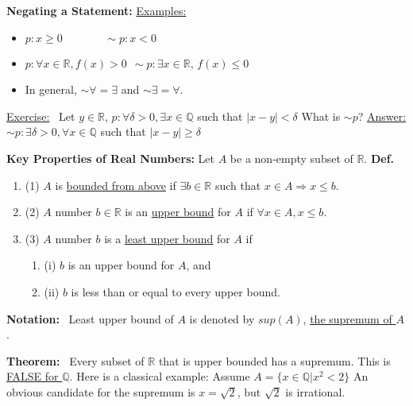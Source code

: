 \documentclass[letterpaper]{article}
\newcommand{\real}{\mathbb R}  %
\begin{document}
\textbf{Negating a Statement:}
\newline
\underline{Examples:}
    \begin{itemize}
        \item[] $p: x\geq 0\ \ \ \ \ \ \ \ \ \ \ \ \ \ \ \ \ \sim p: x< 0$
        \item[] $p: \forall x \in \real, f(x) > 0\ \ \sim p: \exists x \in \real$, $f(x) \leq 0$
        \item[] In general, $\sim \forall = \exists$ and $\sim \exists = \forall$.
    \end{itemize}
\underline{Exercise:}~ Let $y\in\real$,
    \newline
    $p: \forall\delta>0, \exists x \in \mathbb{Q}$ such that $|x-y| < \delta$
    \newline
    What is $\sim p$?
\newline
\underline{Answer:}
    \newline
    $\sim p: \exists\delta>0, \forall x \in \mathbb{Q}$ such that $|x-y| \geq \delta$

\textbf{Key Properties of Real Numbers:} Let $A$ be a non-empty subset of $\real$.
\newline\newline
\textbf{Def.}
    \begin{enumerate}
        \item[] (1) $A$ is \underline{bounded from above} if $\exists b \in \real$ such that $x \in A \Rightarrow x \le b$.
        \item[] (2) $A$ number $b \in \real$ is an \underline{upper bound} for $A$ if $\forall x \in A, x \le b$.
        \item[] (3) $A$ number $b$ is a \underline{least upper bound} for $A$ if
	    \begin{enumerate}
	        \item[] (i) $b$ is an upper bound for $A$, and
	        \item[] (ii) $b$ is less than or equal to every upper bound.
	    \end{enumerate}
    \end{enumerate}

\textbf{Notation:}~ Least upper bound of $A$ is denoted by \underline{$sup(A)$}, \underline{the supremum of $A$}.

\textbf{Theorem:}~ Every subset of $\real$ that is upper bounded has a supremum.
    \newline
    This is \underline{FALSE for $\mathbb{Q}$}.
    \newline
    Here is a classical example:
    \newline
    Assume $A = \{x\in \mathbb{Q} | x^2 < 2\}$
    \newline
    An obvious candidate for the supremum is $x = \sqrt{2}$, but $\sqrt{2}$ is irrational.
\end{document}
